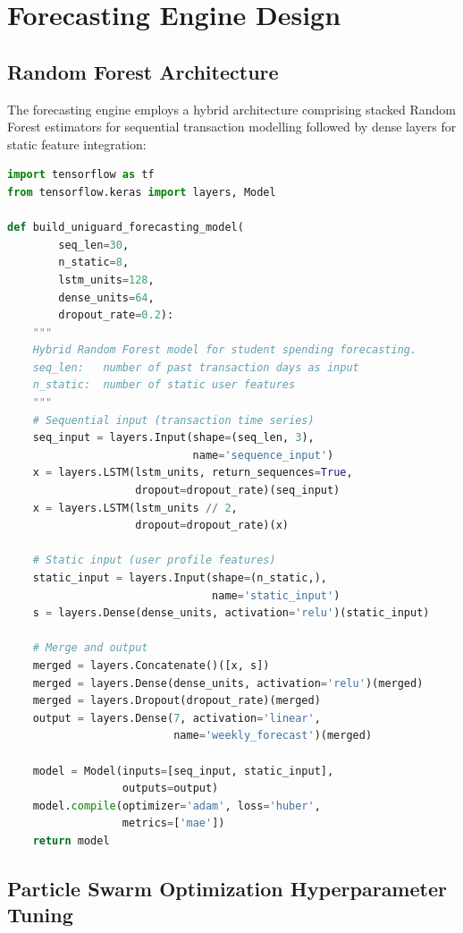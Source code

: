 \documentclass[12pt]{report}
\begin{document}
\section{Forecasting Engine Design}

\subsection{Random Forest Architecture}

The forecasting engine employs a hybrid architecture comprising stacked Random Forest estimators
for sequential transaction modelling followed by dense layers for static feature
integration:

\begin{lstlisting}[language=Python, caption={Random Forest Forecasting Model Architecture}]
import tensorflow as tf
from tensorflow.keras import layers, Model

def build_uniguard_forecasting_model(
        seq_len=30,
        n_static=8,
        lstm_units=128,
        dense_units=64,
        dropout_rate=0.2):
    """
    Hybrid Random Forest model for student spending forecasting.
    seq_len:   number of past transaction days as input
    n_static:  number of static user features
    """
    # Sequential input (transaction time series)
    seq_input = layers.Input(shape=(seq_len, 3),
                             name='sequence_input')
    x = layers.LSTM(lstm_units, return_sequences=True,
                    dropout=dropout_rate)(seq_input)
    x = layers.LSTM(lstm_units // 2,
                    dropout=dropout_rate)(x)

    # Static input (user profile features)
    static_input = layers.Input(shape=(n_static,),
                                name='static_input')
    s = layers.Dense(dense_units, activation='relu')(static_input)

    # Merge and output
    merged = layers.Concatenate()([x, s])
    merged = layers.Dense(dense_units, activation='relu')(merged)
    merged = layers.Dropout(dropout_rate)(merged)
    output = layers.Dense(7, activation='linear',
                          name='weekly_forecast')(merged)

    model = Model(inputs=[seq_input, static_input],
                  outputs=output)
    model.compile(optimizer='adam', loss='huber',
                  metrics=['mae'])
    return model
\end{lstlisting}

\subsection{Particle Swarm Optimization Hyperparameter Tuning}
\end{document}
